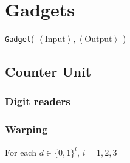 \section{Gadgets}
\label{gadgets}


{ \tt Gadget}( $\left\langle \text{Input} \right\rangle, \left\langle \text{Output}  \right\rangle$ )

\newcommand{\warpunit}{{\tt Warp\_Unit}}
\newcommand{\prewarp}{{\tt Pre\_Warp}}
\newcommand{\firstwarp}{{\tt First\_Warp}}
\newcommand{\warpbridge}{{\tt Warp\_Bridge}}
\newcommand{\secondwarp}{{\tt Second\_Warp}}
\newcommand{\postwarp}{{\tt Post\_Warp}}

\newcommand{\dtop}{{\tt Digit\_Top}}
\newcommand{\dwriter}{{\tt Digit\_Writer}}
\newcommand{\dreader}{{\tt Digit\_Reader}}

\newcommand{\returnfromdonereadnextrow}{{\tt Return\_From\_Digit1\_Read\_Next\_Row}}
\newcommand{\returnfromdtworeadnextrow}{{\tt Return\_From\_Digit2\_Read\_Next\_Row}}
\newcommand{\returnfromdthreereadnextrow}{{\tt Return\_From\_Digit3\_Read\_Next\_Row}}

\newcommand{\returnfromdonereaddtwo}{{\tt Return\_From\_Digit1\_Read\_Digit2}}
\newcommand{\returnfromdonereaddtwocasetwo}{{\tt Return\_From\_Digit1\_Read\_Digit2\_Case2}}
\newcommand{\returnfromdtworeaddthree}{{\tt Return\_From\_Digit2\_Read\_Digit3}}
\newcommand{\returnfromdthreereaddone}{{\tt Return\_From\_Digit3\_Read\_Digit1}}

\newcommand{\inc}{{\tt carry}}

\newcommand{\dtopdonecasetwo}{{\tt Digit\_Top\_Digit1\_Case2}}
\newcommand{\dtopdtwocasetwo}{{\tt Digit\_Top\_Digit2\_Case2}}
\newcommand{\dtopdthreecasethree}{{\tt Digit\_Top\_Digit3\_Case3}}

\subsection{ Counter Unit }



    \subsubsection{ Digit readers }

    \subsubsection{ Warping }
        For each $d \in \{0, 1\}^l$, $i = 1, 2, 3$

